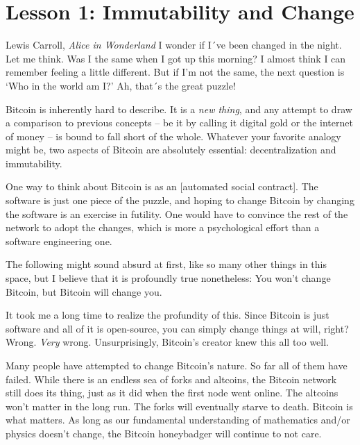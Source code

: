 \chapter{Lesson 1: Immutability and Change}
\label{les:1}

\begin{chapquote}{Lewis Carroll, \textit{Alice in Wonderland}}
I wonder if I´ve been changed in the night. Let me think. Was I the same when I
got up this morning? I almost think I can remember feeling a little different.
But if I'm not the same, the next question is `Who in the world am I?' Ah,
that´s the great puzzle!
\end{chapquote}

Bitcoin is inherently hard to describe. It is a \textit{new thing}, and any
attempt to draw a comparison to previous concepts -- be it by calling
it digital gold or the internet of money -- is bound to fall short of
the whole. Whatever your favorite analogy might be, two aspects of
Bitcoin are absolutely essential: decentralization and immutability.

One way to think about Bitcoin is as an [automated social contract]. The
software is just one piece of the puzzle, and hoping to change Bitcoin
by changing the software is an exercise in futility. One would have to
convince the rest of the network to adopt the changes, which is more a
psychological effort than a software engineering one.

The following might sound absurd at first, like so many other things in
this space, but I believe that it is profoundly true nonetheless: You
won't change Bitcoin, but Bitcoin will change you.

\bigskip


It took me a long time to realize the profundity of this. Since Bitcoin
is just software and all of it is open-source, you can simply change
things at will, right? Wrong. \textit{Very} wrong. Unsurprisingly, Bitcoin's
creator knew this all too well.


Many people have attempted to change Bitcoin's nature. So far all of
them have failed. While there is an endless sea of forks and altcoins,
the Bitcoin network still does its thing, just as it did when the first
node went online. The altcoins won't matter in the long run. The forks
will eventually starve to death. Bitcoin is what matters. As long as our
fundamental understanding of mathematics and/or physics doesn't change,
the Bitcoin honeybadger will continue to not care.

